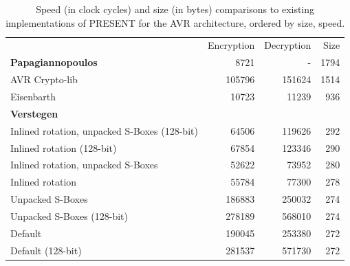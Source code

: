 \documentclass[11pt]{llncs2e} %
\begin{document}

\begin{table}[H]
\centering
\footnotesize
	\begin{tabular}{ l r r r }
		& Encryption & Decryption & Size \\
	\textbf{Papagiannopoulos}~\cite{kostas_code} & 8721 & - & 1794 \\
	AVR Crypto-lib~\cite{avr_crypto_lib} & 105796 & 151624 & 1514 \\
	Eisenbarth~\cite{eisenbarth2012compact} & 10723 & 11239 & 936 \\
	\textbf{Verstegen}~\cite{aram_code} & & & \\
	\hspace{0.4em} Inlined rotation, unpacked S-Boxes (128-bit) &  64506 & 119626 & 292 \\
	\hspace{0.4em} Inlined rotation (128-bit)                   &  67854 & 123346 & 290 \\
	\hspace{0.4em} Inlined rotation, unpacked S-Boxes           &  52622 &  73952 & 280 \\
	\hspace{0.4em} Inlined rotation                             &  55784 &  77300 & 278 \\
	\hspace{0.4em} Unpacked S-Boxes                             & 186883 & 250032 & 274 \\
	\hspace{0.4em} Unpacked S-Boxes (128-bit)                   & 278189 & 568010 & 274 \\
	\hspace{0.4em} Default                                      & 190045 & 253380 & 272 \\
	\hspace{0.4em} Default (128-bit)                            & 281537 & 571730 & 272 \\
	\end{tabular}
	\caption{\footnotesize Speed (in clock cycles) and size (in bytes) comparisons to existing implementations of PRESENT for the AVR architecture, ordered by size, speed.}
	\label{numbers}

\end{table}


{}

\end{document}
